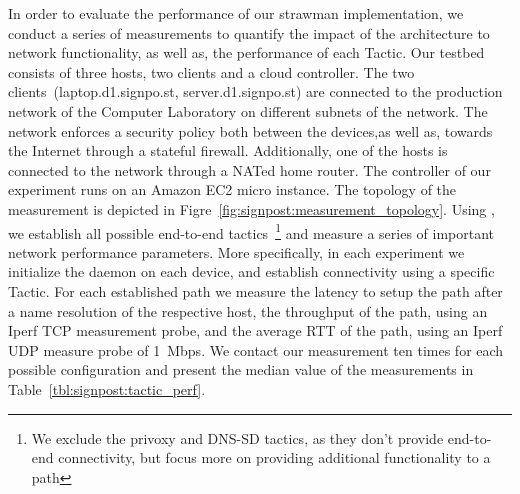In order to evaluate the performance of our strawman implementation, we conduct
a series of measurements to quantify the impact of the architecture to network
functionality, as well as, the performance of each Tactic.  Our testbed consists
of three hosts, two clients and a cloud controller. The two \signpost
clients~(laptop.d1.signpo.st, server.d1.signpo.st)
are connected to the production network of the Computer Laboratory on different
subnets of the network. The network enforces a security policy both between the
devices,as well as, towards the Internet through a stateful firewall.
Additionally, one of the hosts is connected to the network through a NATed 
home router. The \signpost controller of our experiment runs on an
Amazon EC2 micro instance. The topology of the measurement is depicted in
Figre~\ref{fig:signpost:measurement_topology}. Using \signpost, we establish all possible end-to-end
tactics~\footnote{We exclude the privoxy and DNS-SD tactics, as they don't
  provide end-to-end connectivity, but focus more on providing additional
  functionality to a path} and measure a series of important network performance
parameters.  More specifically, in each experiment we initialize the \signpost
daemon on each device, and establish connectivity using a specific Tactic. For
each established path we measure the latency to setup the path after a name
resolution of the respective host, the throughput of the path, using an Iperf
TCP measurement probe, and the average RTT of the path, using an Iperf UDP
measure probe  of 1~Mbps. We contact our measurement ten times for each possible
configuration and present the median value of the measurements in
Table~\ref{tbl:signpost:tactic_perf}. 

